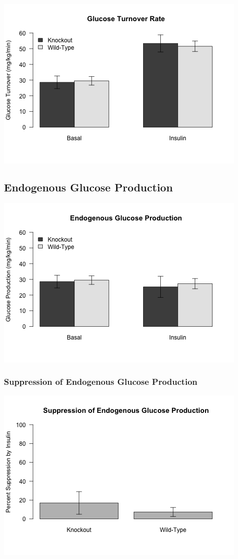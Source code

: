 \documentclass[]{article}
\begin{document}
\includegraphics{figures/glucose-turnover-1.png}

\subsection{Endogenous Glucose
Production}\label{endogenous-glucose-production}

\includegraphics{figures/glucose-production-1.png}

\subsubsection{Suppression of Endogenous Glucose
Production}\label{suppression-of-endogenous-glucose-production}

\includegraphics{figures/sHGP-1.png}
\end{document}
